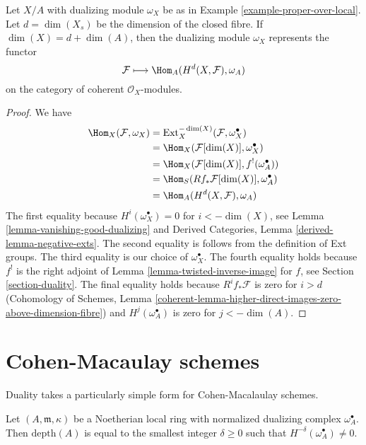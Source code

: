 \begin{lemma}
\label{lemma-dualizing-module-proper-over-A}
Let $X/A$ with dualizing module $\omega_X$ be as in
Example \ref{example-proper-over-local}.
Let $d = \dim(X_s)$ be the dimension
of the closed fibre. If $\dim(X) = d + \dim(A)$, then
the dualizing module $\omega_X$ represents the functor
$$
\mathcal{F} \longmapsto \Hom_A(H^d(X, \mathcal{F}), \omega_A)
$$
on the category of coherent $\mathcal{O}_X$-modules.
\end{lemma}

\begin{proof}
We have
\begin{align*}
\Hom_X(\mathcal{F}, \omega_X)
& =
\text{Ext}^{-\dim(X)}_X(\mathcal{F}, \omega_X^\bullet) \\
& =
\Hom_X(\mathcal{F}[\dim(X)], \omega_X^\bullet) \\
& =
\Hom_X(\mathcal{F}[\dim(X)], f^!(\omega_A^\bullet)) \\
& =
\Hom_S(Rf_*\mathcal{F}[\dim(X)], \omega_A^\bullet) \\
& =
\Hom_A(H^d(X, \mathcal{F}), \omega_A)
\end{align*}
The first equality because $H^i(\omega_X^\bullet) = 0$ for
$i < -\dim(X)$, see Lemma \ref{lemma-vanishing-good-dualizing} and
Derived Categories, Lemma \ref{derived-lemma-negative-exts}.
The second equality is follows from the definition of Ext groups.
The third equality is our choice of $\omega_X^\bullet$.
The fourth equality holds because $f^!$ is the
right adjoint of Lemma \ref{lemma-twisted-inverse-image} for
$f$, see Section \ref{section-duality}.
The final equality holds because $R^if_*\mathcal{F}$ is zero
for $i > d$ (Cohomology of Schemes, Lemma
\ref{coherent-lemma-higher-direct-images-zero-above-dimension-fibre})
and $H^j(\omega_A^\bullet)$ is zero for $j < -\dim(A)$.
\end{proof}








\section{Cohen-Macaulay schemes}
\label{section-CM}

\noindent
Duality takes a particularly simple form for Cohen-Macalaulay schemes.

\begin{lemma}
\label{lemma-depth-in-terms-dualizing-complex}
Let $(A, \mathfrak m, \kappa)$ be a Noetherian local ring with
normalized dualizing complex $\omega_A^\bullet$.
Then $\text{depth}(A)$ is equal to the smallest integer $\delta \geq 0$
such that $H^{-\delta}(\omega_A^\bullet) \not = 0$.
\end{lemma}

